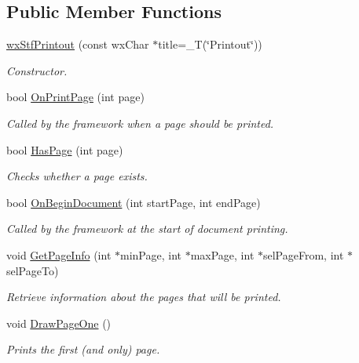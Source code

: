 \subsection*{Public Member Functions}
\begin{DoxyCompactItemize}
\item 
\hyperlink{classwxStfPrintout_a00bdf488a1c7168a300f4000a7466e86}{wxStfPrintout} (const wxChar $\ast$title=\_\-T(\char`\"{}Printout\char`\"{}))
\begin{DoxyCompactList}\small\item\em Constructor. \item\end{DoxyCompactList}\item 
bool \hyperlink{classwxStfPrintout_af5a68115593cf12cac5fb084e8780791}{OnPrintPage} (int page)
\begin{DoxyCompactList}\small\item\em Called by the framework when a page should be printed. \item\end{DoxyCompactList}\item 
bool \hyperlink{classwxStfPrintout_a48bea6b4373bad58aced765267565e93}{HasPage} (int page)
\begin{DoxyCompactList}\small\item\em Checks whether a page exists. \item\end{DoxyCompactList}\item 
bool \hyperlink{classwxStfPrintout_a9847ca3f90dc272cef0e5fe1de8d93dd}{OnBeginDocument} (int startPage, int endPage)
\begin{DoxyCompactList}\small\item\em Called by the framework at the start of document printing. \item\end{DoxyCompactList}\item 
void \hyperlink{classwxStfPrintout_a355447fe2a62d31bfff9e7c12437e234}{GetPageInfo} (int $\ast$minPage, int $\ast$maxPage, int $\ast$selPageFrom, int $\ast$selPageTo)
\begin{DoxyCompactList}\small\item\em Retrieve information about the pages that will be printed. \item\end{DoxyCompactList}\item 
\hypertarget{classwxStfPrintout_a514df3391064b05df4f9489b76185952}{
void \hyperlink{classwxStfPrintout_a514df3391064b05df4f9489b76185952}{DrawPageOne} ()}
\label{classwxStfPrintout_a514df3391064b05df4f9489b76185952}

\begin{DoxyCompactList}\small\item\em Prints the first (and only) page. \item\end{DoxyCompactList}\end{DoxyCompactItemize}


